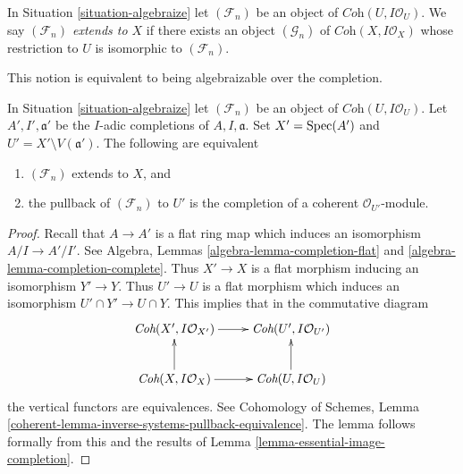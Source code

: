 \begin{definition}
\label{definition-algebraizable}
In Situation \ref{situation-algebraize} let $(\mathcal{F}_n)$ be an
object of $\textit{Coh}(U, I\mathcal{O}_U)$. We say
{\it $(\mathcal{F}_n)$ extends to $X$} if there exists an object
$(\mathcal{G}_n)$ of $\textit{Coh}(X, I\mathcal{O}_X)$ whose restriction
to $U$ is isomorphic to $(\mathcal{F}_n)$.
\end{definition}

\noindent
This notion is equivalent to being algebraizable over the completion.

\begin{lemma}
\label{lemma-algebraizable}
In Situation \ref{situation-algebraize} let $(\mathcal{F}_n)$ be an
object of $\textit{Coh}(U, I\mathcal{O}_U)$. Let $A', I', \mathfrak a'$
be the $I$-adic completions of $A, I, \mathfrak a$. Set $X' = \mathop{\mathrm{Spec}}(A')$
and $U' = X' \setminus V(\mathfrak a')$. The following are equivalent
\begin{enumerate}
\item $(\mathcal{F}_n)$ extends to $X$, and
\item the pullback of $(\mathcal{F}_n)$ to $U'$ is the completion
of a coherent $\mathcal{O}_{U'}$-module.
\end{enumerate}
\end{lemma}

\begin{proof}
Recall that $A \to A'$ is a flat ring map which induces an isomorphism
$A/I \to A'/I'$. See
Algebra, Lemmas \ref{algebra-lemma-completion-flat} and
\ref{algebra-lemma-completion-complete}.
Thus $X' \to X$ is a
flat morphism inducing an isomorphism $Y' \to Y$. Thus $U' \to U$
is a flat morphism which induces an isomorphism $U' \cap Y' \to U \cap Y$.
This implies that in the commutative diagram
$$
\xymatrix{
\textit{Coh}(X', I\mathcal{O}_{X'}) \ar[r] &
\textit{Coh}(U', I\mathcal{O}_{U'}) \\
\textit{Coh}(X, I\mathcal{O}_X) \ar[u] \ar[r] &
\textit{Coh}(U, I\mathcal{O}_U) \ar[u]
}
$$
the vertical functors are equivalences. See
Cohomology of Schemes, Lemma
\ref{coherent-lemma-inverse-systems-pullback-equivalence}.
The lemma follows formally from this and the results of
Lemma \ref{lemma-essential-image-completion}.
\end{proof}

